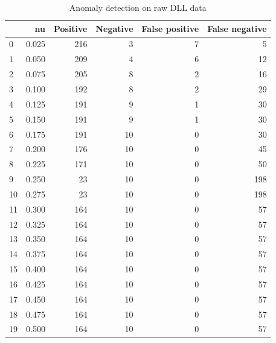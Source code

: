 \documentclass[a4paper,twoside,12pt]{book}
\begin{document}
\begin{appendices}
\begin{table}
	\centering
	\caption{Anomaly detection on raw DLL data}
	\label{id:tab:rawDlls}
	\begin{tabular}{lrrrrr}
		\toprule
		{} &     nu &  Positive &  Negative &  False positive &  False negative \\
		\midrule
		0  &  0.025 &       216 &         3 &               7 &               5 \\
		1  &  0.050 &       209 &         4 &               6 &              12 \\
		2  &  0.075 &       205 &         8 &               2 &              16 \\
		3  &  0.100 &       192 &         8 &               2 &              29 \\
		4  &  0.125 &       191 &         9 &               1 &              30 \\
		5  &  0.150 &       191 &         9 &               1 &              30 \\
		6  &  0.175 &       191 &        10 &               0 &              30 \\
		7  &  0.200 &       176 &        10 &               0 &              45 \\
		8  &  0.225 &       171 &        10 &               0 &              50 \\
		9  &  0.250 &        23 &        10 &               0 &             198 \\
		10 &  0.275 &        23 &        10 &               0 &             198 \\
		11 &  0.300 &       164 &        10 &               0 &              57 \\
		12 &  0.325 &       164 &        10 &               0 &              57 \\
		13 &  0.350 &       164 &        10 &               0 &              57 \\
		14 &  0.375 &       164 &        10 &               0 &              57 \\
		15 &  0.400 &       164 &        10 &               0 &              57 \\
		16 &  0.425 &       164 &        10 &               0 &              57 \\
		17 &  0.450 &       164 &        10 &               0 &              57 \\
		18 &  0.475 &       164 &        10 &               0 &              57 \\
		19 &  0.500 &       164 &        10 &               0 &              57 \\

\end{tabular}
\end{table}
\end{appendices}
\end{document}
